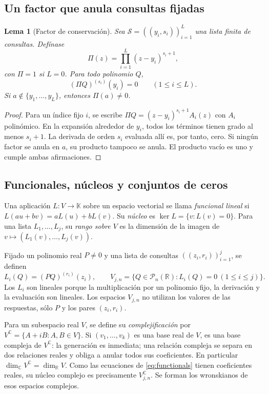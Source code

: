 \documentclass[11pt,a4paper]{article}
\numberwithin{equation}{section}
\newtheorem{lemma}[theorem]{Lema}
\theoremstyle{definition}
\theoremstyle{remark}
\newcommand{\R}{\mathbb R}
\newcommand{\C}{\mathbb C}
\newcommand{\PP}{\mathcal P}
\begin{document}
\subsection{Un factor que anula consultas fijadas}
\begin{lemma}[Factor de conservación]\label{lem:oldfactor}
Sea $\mathcal S=((y_i,s_i))_{i=1}^L$ una lista finita de consultas. Defínase
\[
\Pi(z)=\prod_{i=1}^L(z-y_i)^{s_i+1},
\]
con $\Pi=1$ si $L=0$. Para todo polinomio $Q$,
\[
(\Pi Q)^{(s_i)}(y_i)=0\qquad(1\le i\le L).
\]
Si $a\notin\{y_1,\ldots,y_L\}$, entonces $\Pi(a)\ne0$.
\end{lemma}
\begin{proof}
Para un índice fijo $i$, se escribe $\Pi Q=(z-y_i)^{s_i+1}A_i(z)$ con $A_i$ polinómico. En la expansión alrededor de $y_i$, todos los términos tienen grado al menos $s_i+1$. La derivada de orden $s_i$ evaluada allí es, por tanto, cero. Si ningún factor se anula en $a$, su producto tampoco se anula. El producto vacío es uno y cumple ambas afirmaciones.
\end{proof}

\subsection{Funcionales, núcleos y conjuntos de ceros}
Una aplicación $L:V\to\mathbb K$ sobre un espacio vectorial se llama \emph{funcional lineal} si $L(au+bv)=aL(u)+bL(v)$. Su \emph{núcleo} es $\ker L=\{v:L(v)=0\}$. Para una lista $L_1,\ldots,L_j$, su \emph{rango sobre $V$} es la dimensión de la imagen de $v\mapsto(L_1(v),\ldots,L_j(v))$.

Fijado un polinomio real $P\ne0$ y una lista de consultas $((z_i,r_i))_{i=1}^j$, se definen
\begin{equation}\label{eq:functionals}
L_i(Q)=(PQ)^{(r_i)}(z_i),\qquad
V_{j,n}=\{Q\in\PP_n(\R):L_i(Q)=0\ (1\le i\le j)\}.
\end{equation}
Los $L_i$ son lineales porque la multiplicación por un polinomio fijo, la derivación y la evaluación son lineales. Los espacios $V_{j,n}$ no utilizan los valores de las respuestas, sólo $P$ y los pares $(z_i,r_i)$.

Para un subespacio real $V$, se define su \emph{complejificación} por $V^{\C}=\{A+iB:A,B\in V\}$. Si $(v_1,\ldots,v_k)$ es una base real de $V$, es una base compleja de $V^{\C}$: la generación es inmediata; una relación compleja se separa en dos relaciones reales y obliga a anular todos sus coeficientes. En particular $\dim_\C V^{\C}=\dim_\R V$. Como las ecuaciones de \eqref{eq:functionals} tienen coeficientes reales, su núcleo complejo es precisamente $V_{j,n}^{\C}$. Se forman los wronskianos de esos espacios complejos.
\end{document}
